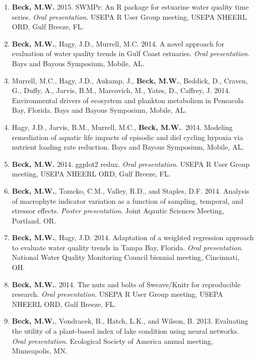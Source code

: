 \documentclass[letterpaper,12pt]{article}
\begin{document}
\begin{enumerate}
\item {\bf Beck, M.W.} 2015. SWMPr: An R package for estuarine water quality time series. \textit{Oral presentation}. USEPA R User Group meeting, USEPA NHEERL ORD, Gulf Breeze, FL.

\item {\bf Beck, M.W.}, Hagy, J.D., Murrell, M.C. 2014. A novel approach for evaluation of water quality trends in Gulf Coast estuaries. \textit{Oral presentation}. Bays and Bayous Symposium, Mobile, AL.

\item Murrell, M.C., Hagy, J.D., Aukamp, J., {\bf Beck, M.W.}, Beddick, D., Craven, G., Duffy, A., Jarvis, B.M., Marcovich, M., Yates, D., Caffrey, J. 2014. Environmental drivers of ecosystem and plankton metabolism in Pensacola Bay, Florida. Bays and Bayous Symposium, Mobile, AL. 

\item Hagy, J.D., Jarvis, B.M., Murrell, M.C., {\bf Beck, M.W.}. 2014. Modeling remediation of aquatic life impacts of episodic and diel cycling hypoxia via nutrient loading rate reduction. Bays and Bayous Symposium, Mobile, AL. 

\item {\bf Beck, M.W.} 2014. ggplot2 redux. \textit{Oral presentation}. USEPA R User Group meeting, USEPA NHEERL ORD, Gulf Breeze, FL.

\item {\bf Beck, M.W.}, Tomcko, C.M., Valley, R.D., and Staples, D.F. 2014. Analysis of macrophyte indicator variation as a function of sampling, temporal, and stressor effects. \textit{Poster presentation}. Joint Aqautic Sciences Meeting, Portland, OR.

\item {\bf Beck, M.W.}, Hagy, J.D. 2014. Adaptation of a weighted regression approach to evaluate water quality trends in {T}ampa {B}ay, {F}lorida. \textit{Oral presentation}. National Water Quality Monitoring Council biennial meeting, Cincinnati, OH.

\item {\bf Beck, M.W.}. 2014. The nuts and bolts of Sweave/Knitr for reproducible research. \textit{Oral presentation}. USEPA R User Group meeting, USEPA NHEERL ORD, Gulf Breeze, FL.

\item {\bf Beck, M.W.}, Vondracek, B., Hatch, L.K., and Wilson, B. 2013. Evaluating the utility of a plant-based index of lake condition using neural networks. \textit{Oral presentation}. Ecological Society of America annual meeting, Minneapolis, MN.


\end{enumerate}
\end{document}
